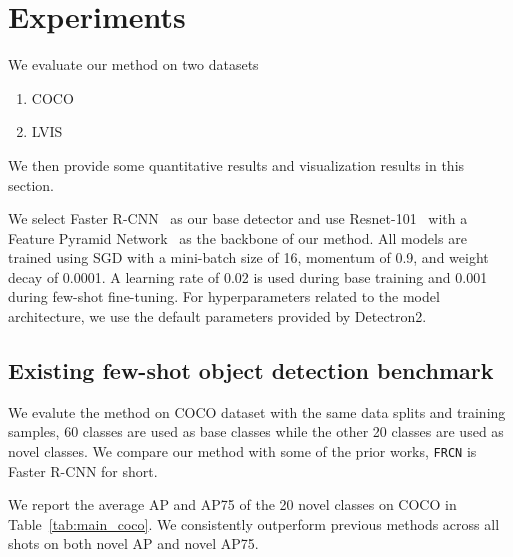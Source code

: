 \section{Experiments}

We evaluate our method on two datasets
\begin{enumerate}
	\item COCO
	\item LVIS
\end{enumerate}
We then provide some quantitative results and visualization results in this section.

We select Faster R-CNN~\cite{ren2015faster} as our base detector and use Resnet-101~\cite{he2016deep} with a Feature Pyramid Network~\cite{lin2016feature} as the backbone of our method.
All models are trained using SGD with a mini-batch size of 16, momentum of 0.9, and weight decay of 0.0001. A learning rate of 0.02 is used during base training and 0.001 during few-shot fine-tuning. 
For hyperparameters related to the model architecture, we use the default parameters provided by Detectron2.

\subsection{Existing few-shot object detection benchmark}
\label{sec:exist_benchmark}
We evalute the method on COCO dataset with the same data splits and training samples, 60 classes are used as base classes while the other 20 classes are used as novel classes. We compare our method with some of the prior works, \texttt{FRCN} is Faster R-CNN for short.

We report the average AP and AP75 of the 20 novel classes on COCO in Table~\ref{tab:main_coco}. We consistently outperform previous methods across all shots on both novel AP and novel AP75.


